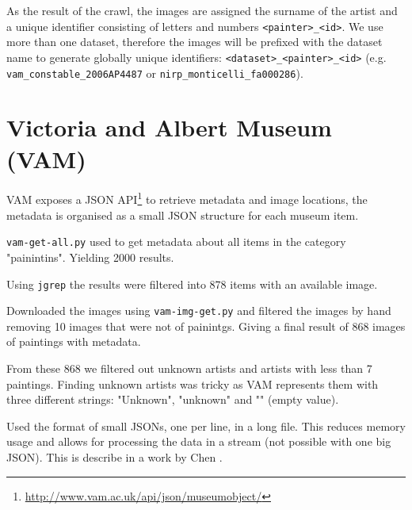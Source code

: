 \documentclass[11pt,a4paper,draft]{report}
\begin{document}
\begin{multicols}{2}

As the result of the crawl, the images are assigned the surname of the artist
and a unique identifier consisting of letters and numbers
\texttt{<painter>\_<id>}.  We use more than one dataset, therefore the images
will be prefixed with the dataset name to generate globally unique identifiers:
\texttt{<dataset>\_<painter>\_<id>} (e.g. \texttt{vam\_constable\_2006AP4487}
or \texttt{nirp\_monticelli\_fa000286}).

\section{Victoria and Albert Museum (VAM)}

VAM exposes a JSON
API\footnote{\href{http://www.vam.ac.uk/api/json/museumobject/}
{http://www.vam.ac.uk/api/json/museumobject/}} to retrieve metadata and image
locations, the metadata is organised as a small JSON structure for each museum
item.

\texttt{vam-get-all.py} used to get metadata about all items in the category
"painintins".  Yielding 2000 results.

Using \texttt{jgrep} the results were filtered into 878 items with an
available image.

Downloaded the images using \texttt{vam-img-get.py} and filtered the images by
hand removing 10 images that were not of painintgs.  Giving a final result of
868 images of paintings with metadata.

From these 868 we filtered out unknown artists and artists with less than 7
paintings.  Finding unknown artists was tricky as VAM represents them with
three different strings: "Unknown", "unknown" and "" (empty value).

Used the format of small JSONs, one per line, in a long file.  This reduces
memory usage and allows for processing the data in a stream (not possible with
one big JSON).  This is describe in a work by Chen \cite{chen09yahoo}.


\end{multicols}
\end{document}
